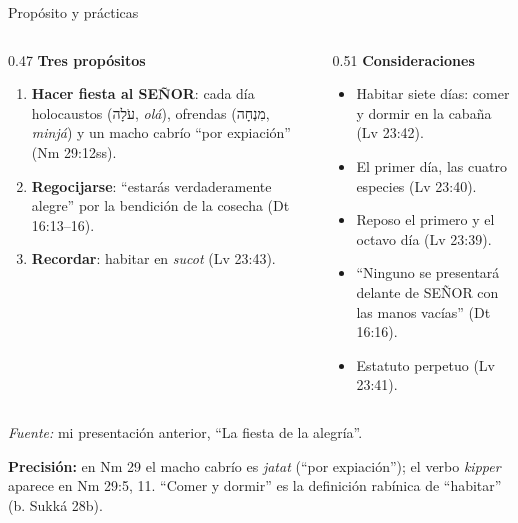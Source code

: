 \documentclass[hyperref={bookmarks=false},aspectratio=169]{beamer}
\newcommand{\heb}[1]{\mbox{\foreignlanguage{hebrew}{#1}}}
\newcommand{\SENOR}{S{\fontsize{0.78em}{1em}\selectfont EÑOR}}
\newcommand{\destacar}[1]{\textbf{\textcolor{tierraroja}{#1}}}
\newcommand{\precision}[1]{{\footnotesize\color{sepia}\textbf{Precisión:} #1}}
\begin{document}
\begin{frame}{Propósito y prácticas}
\begin{columns}[t,onlytextwidth]
\begin{column}{0.47\textwidth}
\destacar{Tres propósitos}\par\smallskip\scriptsize\RaggedRight
\begin{enumerate}
\item \textbf{Hacer fiesta al \SENOR}: cada día holocaustos (\heb{עֹלָה}, \emph{olá}), ofrendas (\heb{מִנְחָה}, \emph{minjá}) y un macho cabrío ``por expiación'' (Nm 29:12ss).
\item \textbf{Regocijarse}: ``estarás verdaderamente alegre'' por la bendición de la cosecha (Dt 16:13--16).
\item \textbf{Recordar}: habitar en \emph{sucot} (Lv 23:43).
\end{enumerate}
\end{column}
\begin{column}{0.51\textwidth}
\destacar{Consideraciones}\par\smallskip\scriptsize\RaggedRight
\begin{itemize}
\item Habitar siete días: comer y dormir en la cabaña (Lv 23:42).
\item El primer día, las cuatro especies (Lv 23:40).
\item Reposo el primero y el octavo día (Lv 23:39).
\item ``Ninguno se presentará delante de \SENOR{} con las manos vacías'' (Dt 16:16).
\item Estatuto perpetuo (Lv 23:41).
\end{itemize}
\end{column}
\end{columns}\par\medskip
{\fontsize{6}{7}\selectfont\color{sepia}\textit{Fuente:} mi presentación anterior, ``La fiesta de la alegría''.}\par
\precision{en Nm 29 el macho cabrío es \emph{jatat} (``por expiación''); el verbo \emph{kipper} aparece en Nm 29:5, 11. ``Comer y dormir'' es la definición rabínica de ``habitar'' (b. Sukká 28b).}
\end{frame}
\end{document}
